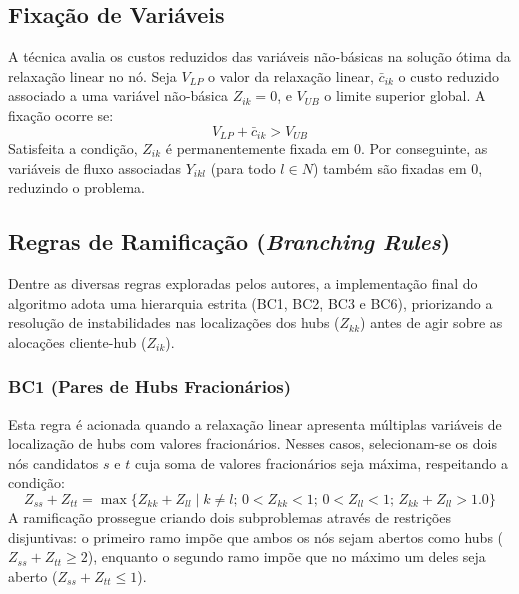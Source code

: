 \subsection{Fixação de Variáveis}

A técnica avalia os custos reduzidos das variáveis não-básicas na solução ótima da relaxação linear no nó. Seja $V_{LP}$ o valor da relaxação linear, $\bar{c}_{ik}$ o custo reduzido associado a uma variável não-básica $Z_{ik} = 0$, e $V_{UB}$ o limite superior global. A fixação ocorre se:
\begin{equation}
    V_{LP} + \bar{c}_{ik} > V_{UB}
\end{equation}
Satisfeita a condição, $Z_{ik}$ é permanentemente fixada em $0$. Por conseguinte, as variáveis de fluxo associadas $Y_{ikl}$ (para todo $l \in N$) também são fixadas em $0$, reduzindo o problema.

\subsection{Regras de Ramificação (\textit{Branching Rules})}

Dentre as diversas regras exploradas pelos autores, a implementação final do algoritmo adota uma hierarquia estrita (BC1, BC2, BC3 e BC6), priorizando a resolução de instabilidades nas localizações dos hubs ($Z_{kk}$) antes de agir sobre as alocações cliente-hub ($Z_{ik}$).

\subsubsection{BC1 (Pares de Hubs Fracionários)}
Esta regra é acionada quando a relaxação linear apresenta múltiplas variáveis de localização de hubs com valores fracionários. Nesses casos, selecionam-se os dois nós candidatos $s$ e $t$ cuja soma de valores fracionários seja máxima, respeitando a condição:
\begin{equation*}
    Z_{ss} + Z_{tt} = \max\{ Z_{kk} + Z_{ll} \mid k \neq l;\, 0 < Z_{kk} < 1;\, 0 < Z_{ll} < 1;\, Z_{kk} + Z_{ll} > 1.0 \}
\end{equation*}
A ramificação prossegue criando dois subproblemas através de restrições disjuntivas: o primeiro ramo impõe que ambos os nós sejam abertos como hubs ($Z_{ss} + Z_{tt} \ge 2$), enquanto o segundo ramo impõe que no máximo um deles seja aberto ($Z_{ss} + Z_{tt} \le 1$).

